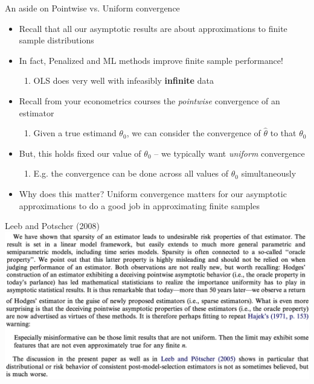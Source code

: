   \begin{frame}[allowframebreaks]{An aside on Pointwise vs. Uniform convergence}
    \begin{itemize}
      \item Recall that all our asymptotic results are about approximations to finite sample distributions
      \item In fact, Penalized and ML methods improve finite sample performance!
        \begin{enumerate}[-]
        \item OLS does very well with infeasibly \textbf{infinite} data
        \end{enumerate}
      \item Recall from your econometrics courses the
        \emph{pointwise} convergence of an estimator
        \begin{enumerate}[-]
        \item Given a true estimand $\theta_{0}$, we can consider the
          convergence of $\hat{\theta}$ to that $\theta_{0}$
        \end{enumerate}
      \item But, this holds fixed our value of $\theta_{0}$ -- we
        typically want \emph{uniform} convergence
        \begin{enumerate}[-]
        \item E.g. the convergence can be done across all values of
          $\theta_{0}$ simultaneously
        \end{enumerate}
      \item Why does this matter? Uniform convergence matters for
        our asymptotic approximations to do a good job in approximating
        finite samples
      \end{itemize}
  \end{frame}
  
  \begin{frame}[allowframebreaks]{Leeb and Potscher (2008)}
    \includegraphics[width=\linewidth]{leebpotscher2.png}\\
    \includegraphics[width=\linewidth]{leebpotscher3.png}
  \end{frame}
  
